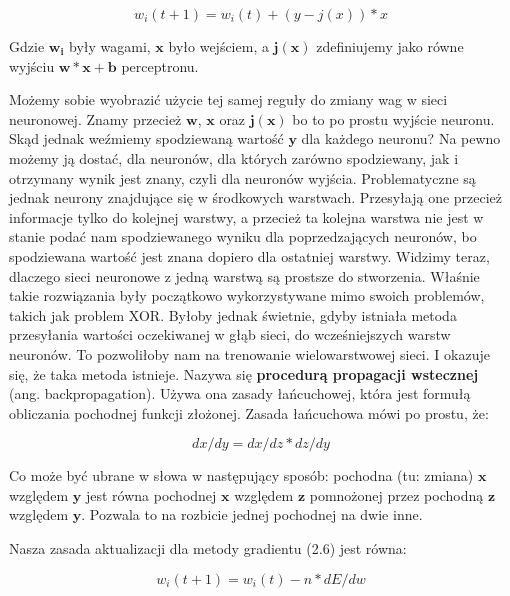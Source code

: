 \begin{equation}
w_i(t+1) = w_i(t) + (y - j(x)) * x
\end{equation}

\noindent Gdzie $\boldsymbol{w_i}$ były wagami, $\boldsymbol{x}$ było wejściem, a $\boldsymbol{j(x)}$ zdefiniujemy jako równe wyjściu $\boldsymbol{w * x + b}$ perceptronu.\newline

Możemy sobie wyobrazić użycie tej samej reguły do zmiany wag w sieci neuronowej. Znamy przecież $\boldsymbol{w}$, $\boldsymbol{x}$ oraz $\boldsymbol{j(x)}$ bo to po prostu wyjście neuronu. Skąd jednak weźmiemy spodziewaną wartość $\boldsymbol{y}$ dla każdego neuronu? Na pewno możemy ją dostać, dla neuronów, dla których zarówno spodziewany, jak i otrzymany wynik jest znany, czyli dla neuronów wyjścia. Problematyczne są jednak neurony znajdujące się w środkowych warstwach. Przesyłają one przecież informacje tylko do kolejnej warstwy, a przecież ta kolejna warstwa nie jest w stanie podać nam spodziewanego wyniku dla poprzedzających neuronów, bo spodziewana wartość jest znana dopiero dla ostatniej warstwy. Widzimy teraz, dlaczego sieci neuronowe z jedną warstwą są prostsze do stworzenia. Właśnie takie rozwiązania były początkowo wykorzystywane mimo swoich problemów, takich jak problem XOR. Byłoby jednak świetnie, gdyby istniała metoda przesyłania wartości oczekiwanej w głąb sieci, do wcześniejszych warstw neuronów. To pozwoliłoby nam na trenowanie wielowarstwowej sieci. I okazuje się, że taka metoda istnieje. Nazywa się \textbf{procedurą propagacji wstecznej} (ang. backpropagation). Używa ona zasady łańcuchowej, która jest formułą obliczania pochodnej funkcji złożonej. Zasada łańcuchowa mówi po prostu, że:

\begin{equation}
dx/dy = dx/dz * dz/dy
\end{equation}

\noindent Co może być ubrane w słowa w następujący sposób: pochodna (tu: zmiana) $\boldsymbol{x}$ względem $\boldsymbol{y}$ jest równa pochodnej $\boldsymbol{x}$ względem $\boldsymbol{z}$ pomnożonej przez pochodną $\boldsymbol{z}$ względem $\boldsymbol{y}$. Pozwala to na rozbicie jednej pochodnej na dwie inne.\newline


\noindent Nasza zasada aktualizacji dla metody gradientu (2.6) jest równa:

\begin{equation}
w_i(t+1) = w_i(t) - n * dE/dw
\end{equation}

